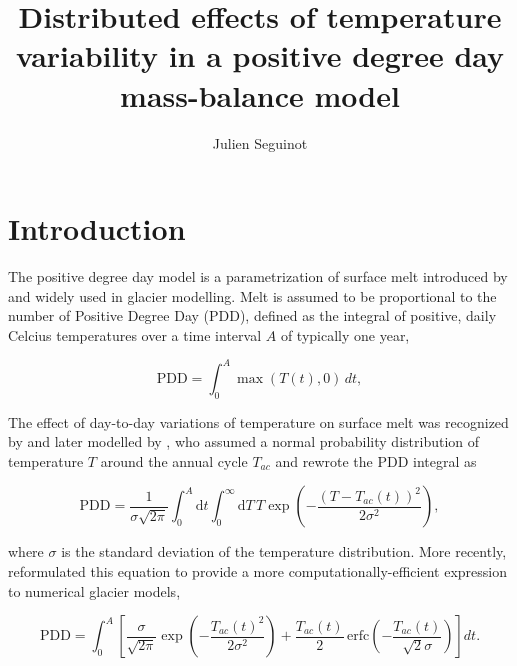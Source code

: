 \documentclass[twocolumn]{igs}
\begin{document}
\title[Temperature variability in a positive degree day model]{Distributed effects of temperature variability in a positive degree day mass-balance model}
\author[J. Seguinot]{Julien Seguinot}

\maketitle


\section{Introduction}

The positive degree day model is a parametrization of surface melt introduced by \citet{braithwaite-1984} and widely used in glacier modelling. Melt is assumed to be proportional to the number of Positive Degree Day (PDD), defined as the integral of positive, daily Celcius temperatures over a time interval $A$ of typically one year,

\begin{equation} \label{eq:pdd}
  \mathrm{PDD} = \int_{0}^{A}\max(T(t),0)\,dt,
\end{equation}

The effect of day-to-day variations of temperature on surface melt was recognized by \citet{braithwaite-1984} and later modelled by \citet{reeh-1991}, who assumed a normal probability distribution of temperature $T$ around the annual cycle $T_{ac}$ and rewrote the PDD integral as

\begin{equation} \label{eq:reeh}
  \mathrm{PDD} = \frac{1}{\sigma\sqrt{2\pi}}
    \int_{0}^{A} \mathrm{d}t
    \int_{0}^{\infty} \mathrm{d}T \,
    T \exp\left({-\frac{(T-T_{ac}(t))^2}{2\sigma^2}}\right),
\end{equation}

where $\sigma$ is the standard deviation of the temperature distribution. More recently, \citet{calov-greve-2005} reformulated this equation to provide a more computationally-efficient expression to numerical glacier models,

\begin{equation} \label{eq:calovgreve}
  \mathrm{PDD} = \int_{0}^{A} \left[
    \frac{\sigma}{\sqrt{2\pi}}
    \exp\left({-\frac{T_{ac}(t)^2}{2\sigma^2}}\right)
    +\frac{T_{ac}(t)}{2} \,
    \mathrm{erfc} \left(-\frac{T_{ac}(t)}{\sqrt{2}\sigma}\right)
  \right]dt.
\end{equation}
\end{document}
